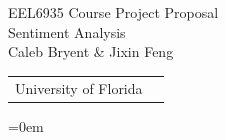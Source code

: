 \documentclass{beamer}
\begin{document}
{
\begin{frame}[plain,c]
\begin{center}
  {\color[RGB]{241,243,186}
{\huge EEL6935 Course Project Proposal\\
    \vspace*{0.5em}
    Sentiment Analysis}\\
  \vspace*{1.8in}
    Caleb Bryent \& Jixin Feng \\
    \vspace*{1em}
  \begin{tabular}{cc}
  University of Florida
   \end{tabular}
}
  \end{center}
\hoffset=0em
\end{frame}}
\end{document}

